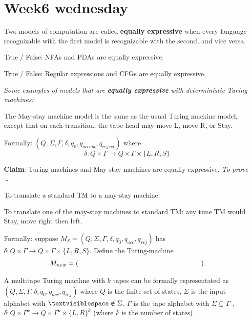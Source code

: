 \documentclass[12pt, oneside]{article}
\begin{document}
\section*{Week6 wednesday}


Two models of computation are called {\bf equally expressive} when 
every language recognizable with the first model is recognizable with the second, and vice versa.

True / False: NFAs and PDAs are equally expressive.

True / False: Regular expressions and CFGs are equally expressive.


\begin{center}
{\large \it  Some examples of models that are {\bf equally expressive} with deterministic Turing machines: }
\end{center}

The May-stay machine model is the same as the usual Turing machine model,  except that
on each transition, the tape head may move L, move R, or Stay. 

Formally: $(Q, \Sigma, \Gamma, \delta, q_0, q_{accept}, q_{reject})$ where 
\[
  \delta: Q \times \Gamma \to Q \times \Gamma \times \{L, R, S\}
\]

{\bf Claim}: Turing machines and May-stay machines are equally expressive. {\it To prove \ldots}

To translate a standard TM to a may-stay machine: 

\vspace{100pt}




To translate one  of the  may-stay machines to standard TM:
any time TM would Stay, move right  then  left.


Formally: suppose $M_S =  (Q, \Sigma, \Gamma, \delta, q_0, q_{acc}, q_{rej})$
has $\delta: Q \times \Gamma \to Q \times \Gamma \times \{L, R, S\}$. Define
the Turing-machine
\[
  M_{new} =  (\phantom{\hspace{2.5in}})
\]

\vfill

\newpage

\vfill


 A multitape Turing macihne with $k$ tapes
can be formally representated as 
$(Q, \Sigma,  \Gamma, \delta, q_0, q_{acc}, q_{rej})$ 
where $Q$ is the finite set of  states,
$\Sigma$ is the  input alphabet with  $\textvisiblespace \notin \Sigma$,
$\Gamma$  is the  tape alphabet with $\Sigma \subsetneq \Gamma$ ,
$\delta: Q\times \Gamma^k\to Q \times \Gamma^k \times \{L,R\}^k$ 
(where $k$ is  the number of  states)
\end{document}
